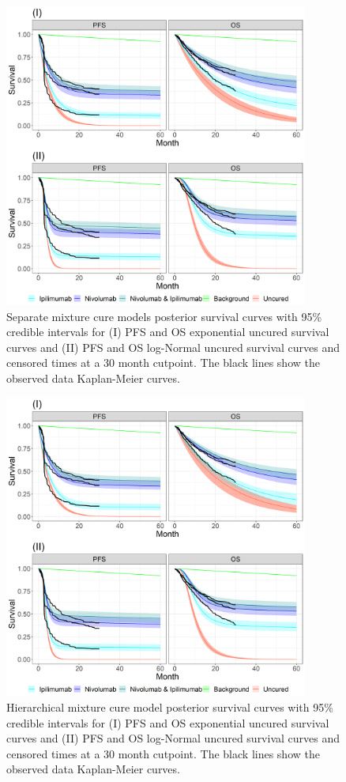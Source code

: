 \documentclass[AMA,STIX1COL]{WileyNJD-v2}
\begin{document}
\begin{figure}[!H]
\centering
\includegraphics[height=10cm, width=0.6\linewidth]{plot_S_grid_cf_sep_cpt_30m.png}
\caption{\label{fig:S_cutpoint_30mo_sep} Separate mixture cure models posterior survival curves with 95\% credible intervals for (I) PFS and OS exponential uncured survival curves and (II) PFS and OS log-Normal uncured survival curves and censored times at a 30 month cutpoint. The black lines show the observed data Kaplan-Meier curves.}
\end{figure}

\begin{figure}[!H]
\centering
\includegraphics[height=10cm, width=0.6\linewidth]{plot_S_grid_cf_hier_cpt_30m.png}
\caption{\label{fig:S_cutpoint_30mo_hier} Hierarchical mixture cure model posterior survival curves with 95\% credible intervals for (I) PFS and OS exponential uncured survival curves and (II) PFS and OS log-Normal uncured survival curves and censored times at a 30 month cutpoint. The black lines show the observed data Kaplan-Meier curves.}
\end{figure}
\end{document}
